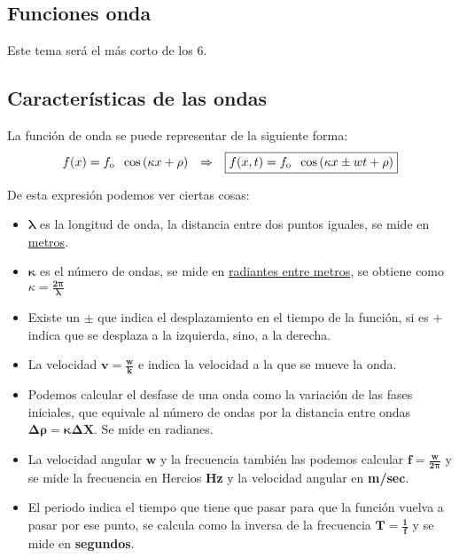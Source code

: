 \subsection{Funciones onda}
\noindent Este tema será el más corto de los 6.
\subsection{Características de las ondas}
\noindent La función de onda se puede representar de la siguiente forma:
\[
        f(x) = f_{\textnormal{o}}\hspace{2mm} \cos{(\kappa x + \rho)} \hspace{2.5mm}\Rightarrow  \hspace{2.5mm}\boxed{f(x,t) = f_{\textnormal{o}}\hspace{2mm}\cos{(\kappa x \pm  wt+\rho)}}
\]
\begin{adjustwidth}{0em}{-8em}
\end{adjustwidth}
\noindent \hspace{-5em} De esta expresión podemos ver ciertas cosas:
\begin{itemize}
        \item \(\mathbf{\lambda}\) es la longitud de onda, la distancia entre dos puntos iguales, se mide en \underline{metros}.
        \item \(\mathbf{\kappa}\) es el número de ondas, se mide en \underline{radiantes entre metros}, se obtiene como \(\boxed{\kappa=\mathbf{\frac{2\pi}{\lambda}}}\)
        \item Existe un \(\mathbf{\pm}\) que indica el desplazamiento en el tiempo de la función, si es \(\mathbf{+}\) indica que se desplaza a la izquierda, sino, a la derecha.
        \item La velocidad \(\boxed{\mathbf{v = \frac{w}{k}}}\) e indica la velocidad a la que se mueve la onda.
        \item Podemos calcular el desfase de una onda como la variación de las fases iniciales, que equivale al número de ondas por la distancia entre ondas \(\boxed{\mathbf{\Delta \rho = \kappa \Delta X}}\). Se mide en radianes.
        \item La velocidad angular \(\mathbf{w}\) y la frecuencia también las podemos calcular \(\boxed{\mathbf{f = \frac{w}{2\pi}}}\) y se mide la frecuencia en Hercios \textbf{Hz} y la velocidad angular en \textbf{m/sec}.
        \item El periodo indica el tiempo que tiene que pasar para que la función vuelva a pasar por ese punto, se calcula como la inversa de la frecuencia \(\boxed{\mathbf{T = \frac{1}{f}}}\) y se mide en \textbf{segundos}.
\end{itemize}
